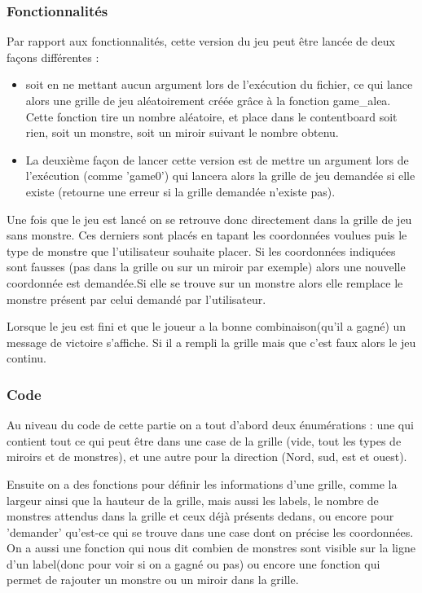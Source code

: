 \documentclass[12]{article}
\begin{document}
\subsubsection{Fonctionnalités}
Par rapport aux fonctionnalités, cette version du jeu peut être lancée de deux façons différentes :
\begin{itemize}
\item soit en ne mettant aucun argument lors de l'exécution du fichier, ce qui lance alors une grille de jeu aléatoirement créée grâce à la fonction game\_alea. Cette fonction tire un nombre aléatoire, et place dans le contentboard soit rien, soit un monstre, soit un miroir suivant le nombre obtenu.
\item La deuxième façon de lancer cette version est de mettre un argument lors de l'exécution (comme 'game0') qui lancera alors la grille de jeu demandée si elle existe (retourne une erreur si la grille demandée n'existe pas).
\end{itemize}
  Une fois que le jeu est lancé on se retrouve donc directement dans la grille de jeu sans monstre. Ces derniers sont placés en tapant les coordonnées voulues puis le type de monstre que l'utilisateur souhaite placer. Si les coordonnées indiquées sont fausses (pas dans la grille ou sur un miroir par exemple) alors une nouvelle coordonnée est demandée.Si elle se trouve sur un monstre alors elle remplace le monstre présent par celui demandé par l'utilisateur.
  
  Lorsque le jeu est fini et que le joueur a la bonne combinaison(qu'il a gagné) un message de victoire s'affiche. Si il a rempli la grille mais que c'est faux alors le jeu continu.
\subsubsection{Code} 
Au niveau du code de cette partie on a tout d'abord deux énumérations : une qui contient tout ce qui peut être dans une case de la grille (vide, tout les types de miroirs et de monstres), et une autre pour la direction (Nord, sud, est et ouest).

Ensuite on a des fonctions pour définir les informations d'une grille, comme la largeur ainsi que la hauteur de la grille, mais aussi les labels, le nombre de monstres attendus dans la grille et ceux déjà présents dedans, ou encore pour 'demander' qu'est-ce qui se trouve dans une case dont on précise les coordonnées. On a aussi une fonction qui nous dit combien de monstres sont visible sur la ligne d'un label(donc pour voir si on a gagné ou pas) ou encore une fonction qui permet de rajouter un monstre ou un miroir dans la grille.
\end{document}
